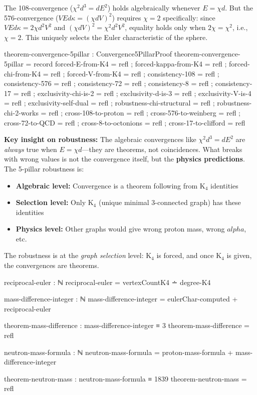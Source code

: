 \documentclass[11pt,a4paper]{book}
\def\alpha{alpha}%
\begin{document}
The 108-convergence ($\chi^2 d^3 = dE^2$) holds algebraically whenever $E = \chi d$.
But the 576-convergence ($VEd\kappa = (\chi dV)^2$) requires $\chi = 2$ specifically:
since $VEd\kappa = 2\chi d^2 V^2$ and $(\chi dV)^2 = \chi^2 d^2 V^2$, equality holds 
only when $2\chi = \chi^2$, i.e., $\chi = 2$. This uniquely selects the Euler 
characteristic of the sphere.

\begin{code}
theorem-convergence-5pillar : Convergence5PillarProof
theorem-convergence-5pillar = record
  { forced-E-from-K4 = refl
  ; forced-kappa-from-K4 = refl
  ; forced-chi-from-K4 = refl
  ; forced-V-from-K4 = refl
  ; consistency-108 = refl
  ; consistency-576 = refl
  ; consistency-72 = refl
  ; consistency-8 = refl
  ; consistency-17 = refl
  ; exclusivity-chi-is-2 = refl
  ; exclusivity-d-is-3 = refl
  ; exclusivity-V-is-4 = refl
  ; exclusivity-self-dual = refl
  ; robustness-chi-structural = refl
  ; robustness-chi-2-works = refl
  ; cross-108-to-proton = refl
  ; cross-576-to-weinberg = refl
  ; cross-72-to-QCD = refl
  ; cross-8-to-octonions = refl
  ; cross-17-to-clifford = refl
  }
\end{code}

\textbf{Key insight on robustness:} The algebraic convergences like $\chi^2 d^3 = d E^2$ 
are \emph{always} true when $E = \chi d$---they are theorems, not coincidences. 
What breaks with wrong values is not the convergence itself, but the 
\textbf{physics predictions}. The 5-pillar robustness is:

\begin{itemize}
\item \textbf{Algebraic level:} Convergence is a theorem following from K$_4$ identities
\item \textbf{Selection level:} Only K$_4$ (unique minimal 3-connected graph) has these identities  
\item \textbf{Physics level:} Other graphs would give wrong proton mass, wrong $\alpha$, etc.
\end{itemize}

The robustness is at the \emph{graph selection} level: K$_4$ is forced, and once 
K$_4$ is given, the convergences are theorems.

\begin{code}
reciprocal-euler : ℕ
reciprocal-euler = vertexCountK4 ∸ degree-K4

mass-difference-integer : ℕ
mass-difference-integer = eulerChar-computed + reciprocal-euler

theorem-mass-difference : mass-difference-integer ≡ 3
theorem-mass-difference = refl

neutron-mass-formula : ℕ
neutron-mass-formula = proton-mass-formula + mass-difference-integer

theorem-neutron-mass : neutron-mass-formula ≡ 1839
theorem-neutron-mass = refl
\end{code}
\end{document}
